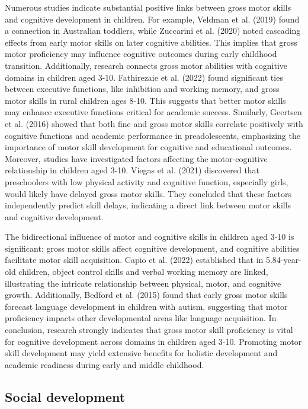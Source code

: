\documentclass[
  letterpaper,
  DIV=11,
  numbers=noendperiod]{scrreprt}
\begin{document}
Numerous studies indicate substantial positive links between gross motor
skills and cognitive development in children. For example, Veldman et
al. (2019) found a connection in Australian toddlers, while Zuccarini et
al. (2020) noted cascading effects from early motor skills on later
cognitive abilities. This implies that gross motor proficiency may
influence cognitive outcomes during early childhood transition.
Additionally, research connects gross motor abilities with cognitive
domains in children aged 3-10. Fathirezaie et al. (2022) found
significant ties between executive functions, like inhibition and
working memory, and gross motor skills in rural children ages 8-10. This
suggests that better motor skills may enhance executive functions
critical for academic success. Similarly, Geertsen et al. (2016) showed
that both fine and gross motor skills correlate positively with
cognitive functions and academic performance in preadolescents,
emphasizing the importance of motor skill development for cognitive and
educational outcomes. Moreover, studies have investigated factors
affecting the motor-cognitive relationship in children aged 3-10. Viegas
et al. (2021) discovered that preschoolers with low physical activity
and cognitive function, especially girls, would likely have delayed
gross motor skills. They concluded that these factors independently
predict skill delays, indicating a direct link between motor skills and
cognitive development.

The bidirectional influence of motor and cognitive skills in children
aged 3-10 is significant; gross motor skills affect cognitive
development, and cognitive abilities facilitate motor skill acquisition.
Capio et al. (2022) established that in 5.84-year-old children, object
control skills and verbal working memory are linked, illustrating the
intricate relationship between physical, motor, and cognitive growth.
Additionally, Bedford et al. (2015) found that early gross motor skills
forecast language development in children with autism, suggesting that
motor proficiency impacts other developmental areas like language
acquisition. In conclusion, research strongly indicates that gross motor
skill proficiency is vital for cognitive development across domains in
children aged 3-10. Promoting motor skill development may yield
extensive benefits for holistic development and academic readiness
during early and middle childhood.

\subsection{Social development}\label{social-development}
\end{document}
